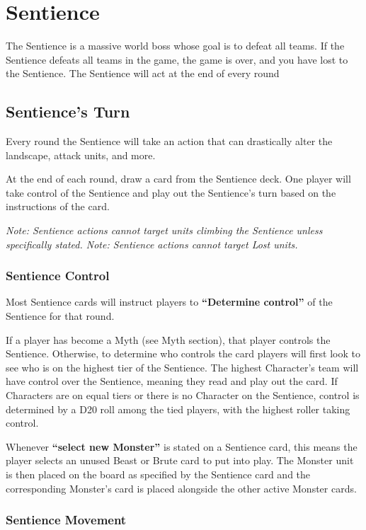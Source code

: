 \documentclass[../main.tex]{subfiles}
\begin{document}
\section{Sentience}
The Sentience is a massive world boss whose goal is to defeat all teams. If the Sentience defeats all teams in the game, the game is over, and you have lost to the Sentience. The Sentience will act at the end of every round

\subsection{Sentience's Turn}
Every round the Sentience will take an action that can drastically alter the landscape, attack units, and more. 

At the end of each round, draw a card from the Sentience deck. One player will take control of the Sentience and play out the Sentience’s turn based on the instructions of the card.

\textit{Note: Sentience actions cannot target units climbing the Sentience unless specifically stated.  Note: Sentience actions cannot target Lost units.}

\subsubsection{Sentience Control}
Most Sentience cards will instruct players to \textbf{ “Determine control”} of the Sentience for that round. 


If a player has become a Myth (see Myth section), that player controls the Sentience. Otherwise, to determine who controls the card players will first look to see who is on the highest tier of the Sentience. The highest Character’s team will have control over the Sentience, meaning they read and play out the card. If Characters are on equal tiers or there is no Character on the Sentience, control is determined by a D20 roll among the tied players, with the highest roller taking control.


Whenever \textbf{“select new Monster”} is stated on a Sentience card, this means the player selects an unused Beast or Brute card to put into play. The Monster unit is then placed on the board as specified by the Sentience card and the corresponding Monster’s card is placed alongside the other active Monster cards.

\subsubsection{Sentience Movement}
\end{document}
